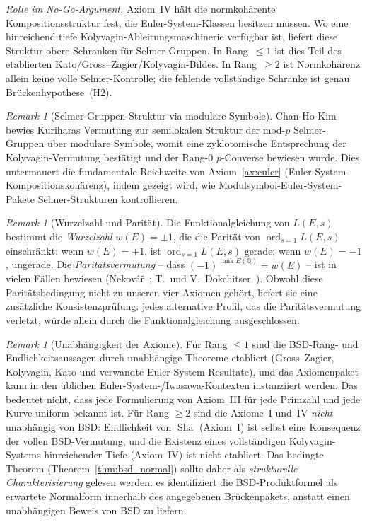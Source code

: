 \documentclass[aps,prd,twocolumn,superscriptaddress,nofootinbib,floatfix]{revtex4-2}
\theoremstyle{definition}
\theoremstyle{remark}
\newtheorem{remark}[theorem]{Remark}
\DeclareMathOperator{\ord}{ord}
\DeclareMathOperator{\rank}{rank}
\DeclareMathOperator{\Sha}{Sha}
\begin{document}
\textit{Rolle im No-Go-Argument.} Axiom~IV hält die normkohärente Kompositionsstruktur fest, die Euler-System-Klassen besitzen müssen. Wo eine hinreichend tiefe Kolyvagin-Ableitungsmaschinerie verfügbar ist, liefert diese Struktur obere Schranken für Selmer-Gruppen. In Rang~$\leq 1$ ist dies Teil des etablierten Kato/Gross--Zagier/Kolyvagin-Bildes. In Rang~$\geq 2$ ist Normkohärenz allein keine volle Selmer-Kontrolle; die fehlende vollständige Schranke ist genau Brückenhypothese~(H2).

\begin{remark}[Selmer-Gruppen-Struktur via modulare Symbole]
\label{rem:kim-kolyvagin}
Chan-Ho Kim~\cite{Kim2025} bewies Kuriharas Vermutung zur semilokalen Struktur der mod-$p$ Selmer-Gruppen über modulare Symbole, womit eine zyklotomische Entsprechung der Kolyvagin-Vermutung bestätigt und der Rang-0 $p$-Converse bewiesen wurde. Dies untermauert die fundamentale Reichweite von Axiom~\ref{ax:euler} (Euler-System-Kompositionskohärenz), indem gezeigt wird, wie Modulsymbol-Euler-System-Pakete Selmer-Strukturen kontrollieren.
\end{remark}

\begin{remark}[Wurzelzahl und Parität]
\label{rem:root_number}
Die Funktionalgleichung von $L(E,s)$ bestimmt die \textit{Wurzelzahl} $w(E) = \pm 1$, die die Parität von $\ord_{s=1} L(E,s)$ einschränkt: wenn $w(E) = +1$, ist $\ord_{s=1} L(E,s)$ gerade; wenn $w(E) = -1$, ungerade. Die \textit{Paritätsvermutung} -- dass $(-1)^{\rank E(\mathbb{Q})} = w(E)$ -- ist in vielen Fällen bewiesen (Nekovář~\cite{Nekovar2006}; T.~und V.~Dokchitser~\cite{Dokchitser2010}). Obwohl diese Paritätsbedingung nicht zu unseren vier Axiomen gehört, liefert sie eine zusätzliche Konsistenzprüfung: jedes \glqq alternative Profil\grqq{}, das die Paritätsvermutung verletzt, würde allein durch die Funktionalgleichung ausgeschlossen.
\end{remark}

\begin{remark}[Unabhängigkeit der Axiome]
\label{rem:axiom-independence}
Für Rang $\leq 1$ sind die BSD-Rang- und Endlichkeitsaussagen durch unabhängige Theoreme etabliert (Gross--Zagier, Kolyvagin, Kato und verwandte Euler-System-Resultate), und das Axiomenpaket kann in den üblichen Euler-System-/Iwasawa-Kontexten instanziiert werden. Das bedeutet nicht, dass jede Formulierung von Axiom~III für jede Primzahl und jede Kurve uniform bekannt ist. Für Rang $\geq 2$ sind die Axiome~I und~IV \textit{nicht} unabhängig von BSD: Endlichkeit von $\Sha$ (Axiom~I) ist selbst eine Konsequenz der vollen BSD-Vermutung, und die Existenz eines vollständigen Kolyvagin-Systems hinreichender Tiefe (Axiom~IV) ist nicht etabliert. Das bedingte Theorem (Theorem~\ref{thm:bsd_normal}) sollte daher als \textit{strukturelle Charakterisierung} gelesen werden: es identifiziert die BSD-Produktformel als erwartete Normalform innerhalb des angegebenen Brückenpakets, anstatt einen unabhängigen Beweis von BSD zu liefern.
\end{remark}
\end{document}

